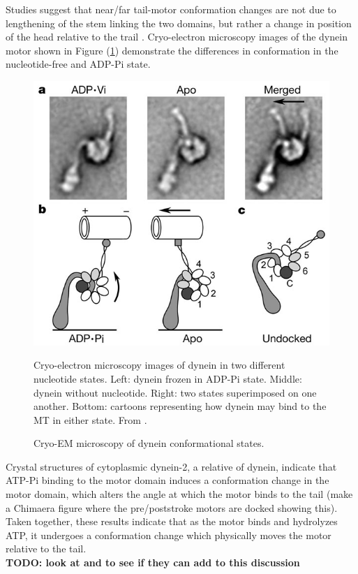 \documentclass[10pt]{article} %
\begin{document}
Studies suggest that near/far tail-motor conformation changes are not due to lengthening of the stem linking the two domains, but rather a change in position of the head relative to the trail \cite{FRETstatepaper} \cite{burgess-paper}. Cryo-electron microscopy images of the dynein motor shown in Figure (\ref{fig:cryo-em-angles}) demonstrate the differences in conformation in the nucleotide-free and ADP-Pi state.\\

\begin{figure}[h]
  \centering
  \includegraphics[width=.65\textwidth,keepaspectratio]{../../figures//burgess-dynein-angles}
  \caption{Cryo-EM microscopy of dynein conformational states.}{Cryo-electron microscopy images of dynein in two different nucleotide states. Left: dynein frozen in ADP-Pi state. Middle: dynein without nucleotide. Right: two states superimposed on one another. Bottom: cartoons representing how dynein may bind to the MT in either state. From \cite{burgess-paper}.}
  \label{fig:cryo-em-angles}
\end{figure}

Crystal structures of cytoplasmic dynein-2, a relative of dynein, indicate that ATP-Pi binding to the motor domain induces a conformation change in the motor domain, which alters the angle at which the motor binds to the tail \cite{carter-paper} (make a Chimaera figure where the pre/poststroke motors are docked showing this). Taken together, these results indicate that as the motor binds and hydrolyzes ATP, it undergoes a conformation change which physically moves the motor relative to the tail.\\

\textbf{TODO: look at \cite{nicastro} and \cite{schmidt-carter} to see if they can add to this discussion}
\end{document}
